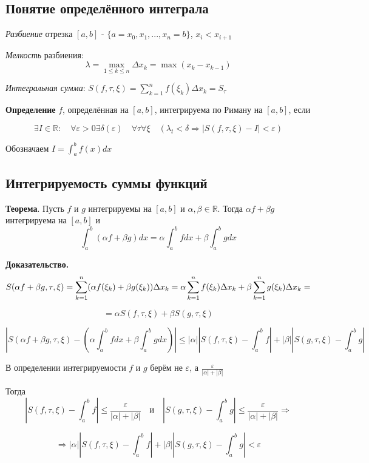 \documentclass[a4paper]{article}
\begin{document}
\begin{definit}
\subsection*{Понятие определённого интеграла}

\textit{Разбиение} отрезка $[a, b]$ - $\{ a = x_0, x_1, ..., x_n = b\}$, $x_i < x_{i+1}$

\textit{Мелкость} разбиения: $$\lambda = \max_{1 \leq k \leq n} \Delta x_k = \max (x_k - x_{k-1})$$

\textit{Интегральная сумма}: $S(f, \tau, \xi) = \sum_{k=1}^n f(\xi_k) \Delta x_k = S_\tau$

\textbf{Определение} $f$, определённая на $[a,b]$, интегрируема по Риману на $[a,b]$, если

$$\exists I \in \mathbb{R}: \quad \forall \varepsilon > 0 \exists \delta (\varepsilon) \quad \forall \tau  \forall \xi \quad (\lambda_t < \delta \Rightarrow |S(f, \tau, \xi) - I| < \varepsilon)$$

Обозначаем $I = \int_a^b f(x)dx$


\end{definit}

\begin{definit}
\subsection*{Интегрируемость суммы функций}
\begin{htheorem}\textbf{Теорема}.
Пусть $f$ и $g$ интегрируемы на $[a,b]$ и $\alpha, \beta \in \mathbb{R}$. Тогда $\alpha f + \beta g$ интегрируема на $[a,b]$ и $$\int_a^b(\alpha f + \beta g)dx = \alpha \int_a^b fdx + \beta \int_a^b gdx$$
\end{htheorem}

\begin{hproof}\textbf{Доказательство.}
$$S(\alpha f + \beta g, \tau, \xi) = \sum_{k=1}^n (\alpha f(\xi_k) + \beta g(\xi_k)) \Delta x_k = \newline \alpha \sum_{k=1}^n f(\xi_k) \Delta x_k + \beta \sum_{k=1}^n g(\xi_k) \Delta x_k = $$ 

$$= \alpha S(f, \tau, \xi) + \beta S(g, \tau, \xi)$$


$$ \left| S(\alpha f + \beta g, \tau, \xi) - \left( \alpha \int_a^b fdx + \beta \int_a^b gdx \right) \right| \leq |\alpha| \left| S(f, \tau, \xi) - \int_a^b f \right| + |\beta| \left| S(g, \tau, \xi) - \int_a^b g  \right|$$

В определении интегрируемости $f$ и $g$ берём не $\varepsilon$, а $\frac{\varepsilon}{|\alpha|+|\beta|}$

Тогда $$ \left| S(f, \tau, \xi) - \int_a^b f \right| \leq \frac{\varepsilon}{|\alpha|+|\beta|}\quad \text{и} \quad \left| S(g, \tau, \xi) - \int_a^b g  \right| \leq \frac{\varepsilon}{|\alpha|+|\beta|} \Rightarrow$$

$$
\Rightarrow |\alpha| \left| S(f, \tau, \xi) - \int_a^b f \right| + |\beta| \left| S(g, \tau, \xi) - \int_a^b g  \right| < \varepsilon$$

\end{hproof}
\end{definit}
\end{document}

